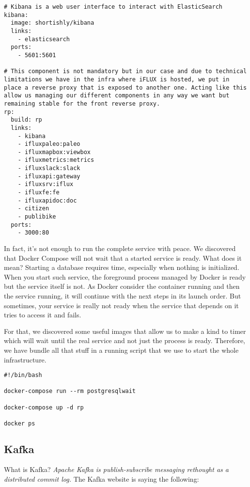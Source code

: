 \begin{lstlisting}
# Kibana is a web user interface to interact with ElasticSearch
kibana:
  image: shortishly/kibana
  links:
    - elasticsearch
  ports:
    - 5601:5601

# This component is not mandatory but in our case and due to technical limitations we have in the infra where iFLUX is hosted, we put in place a reverse proxy that is exposed to another one. Acting like this allow us managing our different components in any way we want but remaining stable for the front reverse proxy.
rp:
  build: rp
  links:
    - kibana
    - ifluxpaleo:paleo
    - ifluxmapbox:viewbox
    - ifluxmetrics:metrics
    - ifluxslack:slack
    - ifluxapi:gateway
    - ifluxsrv:iflux
    - ifluxfe:fe
    - ifluxapidoc:doc
    - citizen
    - publibike
  ports:
    - 3000:80
\end{lstlisting}

In fact, it's not enough to run the complete service with peace. We discovered that Docker Compose will not wait that a started service is ready. What does it mean? Starting a database requires time, especially when nothing is initialized. When you start such service, the foreground process managed by Docker is ready but the service itself is not. As Docker consider the container running and then the service running, it will continue with the next steps in its launch order. But sometimes, your service is really not ready when the service that depends on it tries to access it and fails.

For that, we discovered some useful images that allow us to make a kind to timer which will wait until the real service and not just the process is ready. Therefore, we have bundle all that stuff in a running script that we use to start the whole infrastructure.

\begin{lstlisting}
#!/bin/bash

docker-compose run --rm postgresqlwait

docker-compose up -d rp

docker ps
\end{lstlisting}

\subsection{Kafka}

What is Kafka? \emph{Apache Kafka is publish-subscribe messaging rethought as a distributed commit log.} The Kafka website is saying the following:


